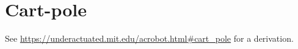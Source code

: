 \section{Cart-pole}

See \url{https://underactuated.mit.edu/acrobot.html#cart_pole} for a derivation.
